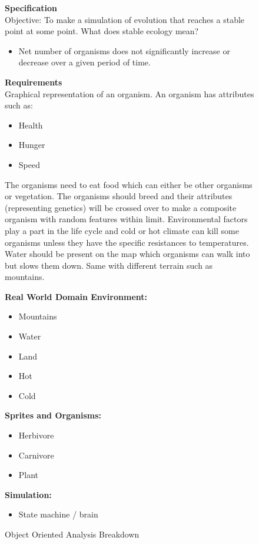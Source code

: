 \documentclass[a4paper, oneside, 11pt]{report}
\begin{document}
{\begin{figure}[H]
	\caption{Object Oriented Analysis Breakdown}\label{ooa-breakdown}
	
	\textbf{Specification} \\
	Objective: To make a simulation of evolution that reaches a stable point at some point.
	What does stable ecology mean? 
	\begin{itemize}
		\item Net number of organisms does not significantly increase or decrease over a given period of time.
	\end{itemize}
	\textbf{Requirements} \\
	Graphical representation of an organism.
	An organism has attributes such as:
	\begin{itemize}
		\item Health 
		\item Hunger 
		\item Speed
	\end{itemize}
	The organisms need to eat food which can either be other organisms or vegetation. 
	The organisms should breed and their attributes (representing genetics) will be crossed over to make a composite organism with random features within limit. 
	Environmental factors play a part in the life cycle and cold or hot climate can kill some organisms unless they have the specific resistances to temperatures. 
	Water should be present on the map which organisms can walk into but slows them down. Same with different terrain such as mountains. 
	
	\textbf{Real World Domain Environment:}
	\begin{itemize}
		\item Mountains
		\item Water
		\item Land
		\item Hot
		\item Cold
	\end{itemize}
	
	\textbf{Sprites and Organisms:}
	\begin{itemize}
		\item Herbivore 
		\item Carnivore 
		\item Plant
	\end{itemize}
	
	\textbf{Simulation:}
	\begin{itemize}
		\item State machine / brain
	\end{itemize}
\end{figure}

}
\end{document}
